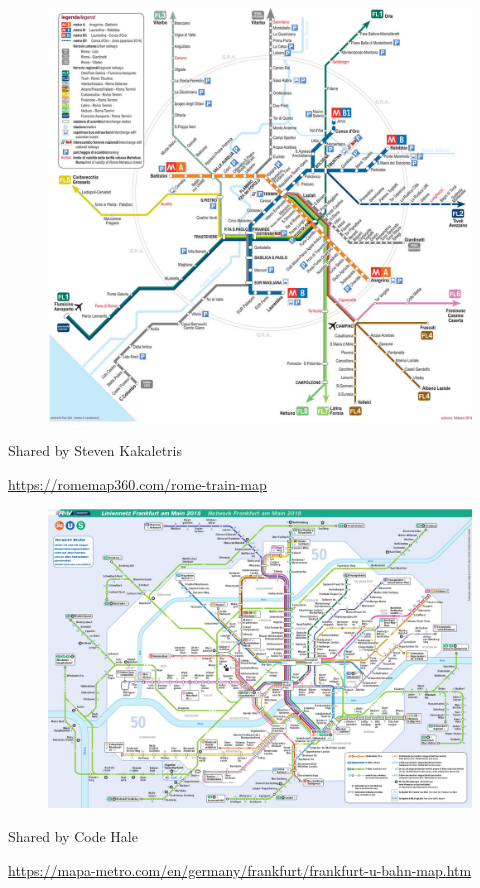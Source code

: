 \documentclass[aspectratio=169]{beamer}
\begin{document}
\begin{frame}
	
	\begin{figure}
		\centering
		\includegraphics[width=0.6\linewidth]{images/rome-train-map.jpeg}
	\end{figure}
	
	\tiny Shared by Steven Kakaletris
	
	\tiny \url{https://romemap360.com/rome-train-map}
	
\end{frame}




\begin{frame}
	
	\begin{figure}
		\centering
		\includegraphics[width=0.86\linewidth]{images/frankfurt.jpg}
	\end{figure}
	
	\tiny Shared by Code Hale
	
	\tiny \url{https://mapa-metro.com/en/germany/frankfurt/frankfurt-u-bahn-map.htm}
	
\end{frame}
\end{document}
